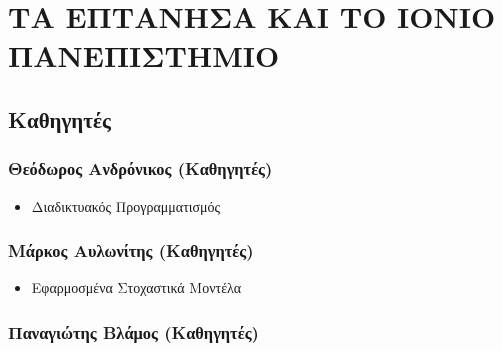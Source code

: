 \documentclass[
]{article}
\author{}
\date{}
\begin{document}
\hypertarget{ux3c4ux3b1-ux3b5ux3c0ux3c4ux3b1ux3bdux3b7ux3c3ux3b1-ux3baux3b1ux3b9-ux3c4ux3bf-ux3b9ux3bfux3bdux3b9ux3bf-ux3c0ux3b1ux3bdux3b5ux3c0ux3b9ux3c3ux3c4ux3b7ux3bcux3b9ux3bf}{%
\section{ΤΑ ΕΠΤΑΝΗΣΑ ΚΑΙ ΤΟ ΙΟΝΙΟ
ΠΑΝΕΠΙΣΤΗΜΙΟ}\label{ux3c4ux3b1-ux3b5ux3c0ux3c4ux3b1ux3bdux3b7ux3c3ux3b1-ux3baux3b1ux3b9-ux3c4ux3bf-ux3b9ux3bfux3bdux3b9ux3bf-ux3c0ux3b1ux3bdux3b5ux3c0ux3b9ux3c3ux3c4ux3b7ux3bcux3b9ux3bf}}

\hypertarget{ux3baux3b1ux3b8ux3b7ux3b3ux3b7ux3c4ux3adux3c2}{%
\subsection{Καθηγητές}\label{ux3baux3b1ux3b8ux3b7ux3b3ux3b7ux3c4ux3adux3c2}}

\hypertarget{ux3b8ux3b5ux3ccux3b4ux3c9ux3c1ux3bfux3c2-ux3b1ux3bdux3b4ux3c1ux3ccux3bdux3b9ux3baux3bfux3c2-ux3baux3b1ux3b8ux3b7ux3b3ux3b7ux3c4ux3adux3c2}{%
\subsubsection{Θεόδωρος Ανδρόνικος
(Καθηγητές)}\label{ux3b8ux3b5ux3ccux3b4ux3c9ux3c1ux3bfux3c2-ux3b1ux3bdux3b4ux3c1ux3ccux3bdux3b9ux3baux3bfux3c2-ux3baux3b1ux3b8ux3b7ux3b3ux3b7ux3c4ux3adux3c2}}

\begin{itemize}
\item
  Διαδικτυακός Προγραμματισμός
\end{itemize}

\hypertarget{ux3bcux3acux3c1ux3baux3bfux3c2-ux3b1ux3c5ux3bbux3c9ux3bdux3afux3c4ux3b7ux3c2-ux3baux3b1ux3b8ux3b7ux3b3ux3b7ux3c4ux3adux3c2}{%
\subsubsection{Μάρκος Αυλωνίτης
(Καθηγητές)}\label{ux3bcux3acux3c1ux3baux3bfux3c2-ux3b1ux3c5ux3bbux3c9ux3bdux3afux3c4ux3b7ux3c2-ux3baux3b1ux3b8ux3b7ux3b3ux3b7ux3c4ux3adux3c2}}

\begin{itemize}
\item
  Εφαρμοσμένα Στοχαστικά Μοντέλα
\end{itemize}

\hypertarget{ux3c0ux3b1ux3bdux3b1ux3b3ux3b9ux3ceux3c4ux3b7ux3c2-ux3b2ux3bbux3acux3bcux3bfux3c2-ux3baux3b1ux3b8ux3b7ux3b3ux3b7ux3c4ux3adux3c2}{%
\subsubsection{Παναγιώτης Βλάμος
(Καθηγητές)}\label{ux3c0ux3b1ux3bdux3b1ux3b3ux3b9ux3ceux3c4ux3b7ux3c2-ux3b2ux3bbux3acux3bcux3bfux3c2-ux3baux3b1ux3b8ux3b7ux3b3ux3b7ux3c4ux3adux3c2}}
\end{document}
